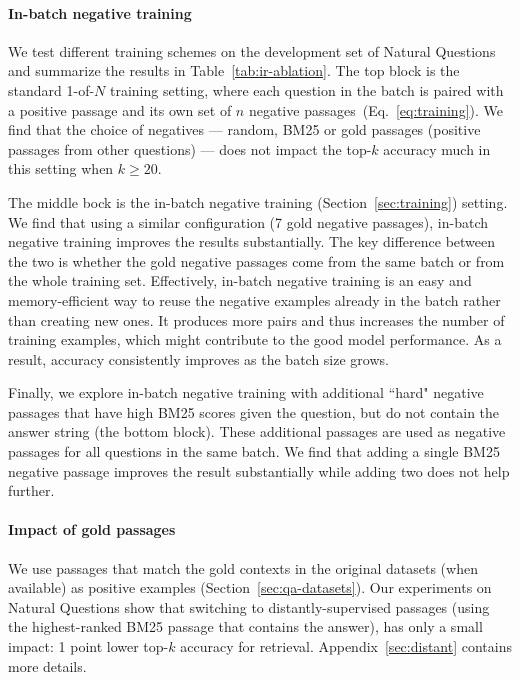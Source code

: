 \paragraph{In-batch negative training}
\label{sec:ir_ablation}
We test different training schemes on the development set of Natural Questions and summarize the results in Table~\ref{tab:ir-ablation}. 
The top block is the standard 1-of-$N$ training setting, where each question in the batch is paired with a positive passage and its own set of $n$ negative passages~(Eq.~\eqref{eq:training}).
We find that the choice of negatives --- random, BM25 or gold passages (positive passages from other questions) --- does not impact the top-$k$ accuracy much in this setting when $k \ge 20$.%




The middle bock is the in-batch negative training (Section~\ref{sec:training}) setting.
We find that using a similar configuration (7 gold negative passages), in-batch negative training improves the results substantially.
The key difference between the two is whether the gold negative passages come from the same batch or from the whole training set.
Effectively, in-batch negative training is an easy and memory-efficient way to reuse the negative examples already in the batch rather than creating new ones.
It produces more pairs and thus increases the number of training examples, which might contribute to the good model performance. 
As a result, accuracy consistently improves as the batch size grows.

Finally, we explore in-batch negative training with additional ``hard" negative passages that have high BM25 scores given the question, but do not contain the answer string (the bottom block). These additional passages are used as negative passages for all questions in the same batch.
We find that adding a single BM25 negative passage improves the result substantially while adding two does not help further.



\paragraph{Impact of gold passages} %
\label{sec:pos_pass}
We use passages that match the gold contexts in the original datasets (when available) as positive examples (Section~\ref{sec:qa-datasets}).
Our experiments on Natural Questions show that switching to distantly-supervised passages (using the highest-ranked BM25 passage that contains the answer), has only a small impact: 1 point lower top-$k$ accuracy for retrieval. %
Appendix~\ref{sec:distant} contains more details.



